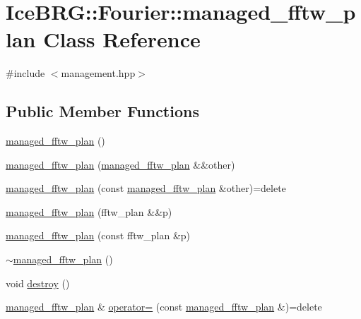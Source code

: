 \hypertarget{classIceBRG_1_1Fourier_1_1managed__fftw__plan}{}\section{Ice\+B\+R\+G\+:\+:Fourier\+:\+:managed\+\_\+fftw\+\_\+plan Class Reference}
\label{classIceBRG_1_1Fourier_1_1managed__fftw__plan}


{\ttfamily \#include $<$management.\+hpp$>$}

\subsection*{Public Member Functions}
\begin{DoxyCompactItemize}
\item 
\hyperlink{classIceBRG_1_1Fourier_1_1managed__fftw__plan_aa74e4d70d701caf7e91df9f4fcc66d2f}{managed\+\_\+fftw\+\_\+plan} ()
\item 
\hyperlink{classIceBRG_1_1Fourier_1_1managed__fftw__plan_a7547232594624c7ae2fd34b6b7678ac3}{managed\+\_\+fftw\+\_\+plan} (\hyperlink{classIceBRG_1_1Fourier_1_1managed__fftw__plan}{managed\+\_\+fftw\+\_\+plan} \&\&other)
\item 
\hyperlink{classIceBRG_1_1Fourier_1_1managed__fftw__plan_a983042eea7e191220f0cb6698e0352b4}{managed\+\_\+fftw\+\_\+plan} (const \hyperlink{classIceBRG_1_1Fourier_1_1managed__fftw__plan}{managed\+\_\+fftw\+\_\+plan} \&other)=delete
\item 
\hyperlink{classIceBRG_1_1Fourier_1_1managed__fftw__plan_aafab54381a7b5a4c70ef5dda0db36333}{managed\+\_\+fftw\+\_\+plan} (fftw\+\_\+plan \&\&p)
\item 
\hyperlink{classIceBRG_1_1Fourier_1_1managed__fftw__plan_a53efa350723d5c18331591b260518466}{managed\+\_\+fftw\+\_\+plan} (const fftw\+\_\+plan \&p)
\item 
\hyperlink{classIceBRG_1_1Fourier_1_1managed__fftw__plan_afa8a38eb58a89782b2f376778dc87648}{$\sim$managed\+\_\+fftw\+\_\+plan} ()
\item 
void \hyperlink{classIceBRG_1_1Fourier_1_1managed__fftw__plan_ada8a304473896d3b8a95b70f44ad529b}{destroy} ()
\item 
\hyperlink{classIceBRG_1_1Fourier_1_1managed__fftw__plan}{managed\+\_\+fftw\+\_\+plan} \& \hyperlink{classIceBRG_1_1Fourier_1_1managed__fftw__plan_a4fa6e150aedbfb5d1e008ca6fc179e0b}{operator=} (const \hyperlink{classIceBRG_1_1Fourier_1_1managed__fftw__plan}{managed\+\_\+fftw\+\_\+plan} \&)=delete

\end{DoxyCompactItemize}
